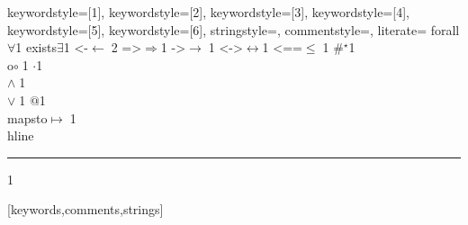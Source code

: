 {%
    keywordstyle=[1]{\ttfamily},
    keywordstyle=[2]{\ttfamily},
    keywordstyle=[3]{\ttfamily},
    keywordstyle=[4]{\ttfamily},
    keywordstyle=[5]{\ttfamily},
    keywordstyle=[6]{\ttfamily},
    stringstyle=\ttfamily,
    commentstyle={\ttfamily},
    literate=
        {forall}{$\forall$}1
        {exists}{{$\exists$}}1
        {<-}{{$\leftarrow\;$}}2
        {=>}{{$\Rightarrow$}}1
        {->}{$\rightarrow\;$}1
        {<->}{$\leftrightarrow$}1
        {<==}{{$\leq\;$}}1
        {\#}{{$^\star$}}1
        {\\o}{{$\circ\;$}}1
        {\@}{{$\cdot$}}1
        {\/\\}{{$\wedge\;$}}1
        {\\\/}{{$\vee\;$}}1
        {\@\@}{{$@$}}1
        {\\mapsto}{{$\mapsto\;$}}1
        {\\hline}{{\rule{\linewidth}{0.5pt}}}1
%
}[keywords,comments,strings]